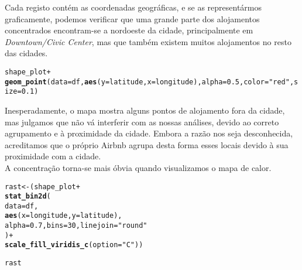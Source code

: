 \documentclass[a4paper, justified]{tufte-handout}\usepackage[]{graphicx}\usepackage[]{xcolor}
\makeatletter
\newcommand{\hlnum}[1]{\textcolor[rgb]{0.686,0.059,0.569}{#1}}%
\newcommand{\hlstr}[1]{\textcolor[rgb]{0.192,0.494,0.8}{#1}}%
\newcommand{\hlopt}[1]{\textcolor[rgb]{0,0,0}{#1}}%
\newcommand{\hlstd}[1]{\textcolor[rgb]{0.345,0.345,0.345}{#1}}%
\newcommand{\hlkwb}[1]{\textcolor[rgb]{0.69,0.353,0.396}{#1}}%
\newcommand{\hlkwc}[1]{\textcolor[rgb]{0.333,0.667,0.333}{#1}}%
\newcommand{\hlkwd}[1]{\textcolor[rgb]{0.737,0.353,0.396}{\textbf{#1}}}%
\newenvironment{kframe}{%
 \def\at@end@of@kframe{}%
 \ifinner\ifhmode%
  \def\at@end@of@kframe{\end{minipage}}%
  \begin{minipage}{\columnwidth}%
 \fi\fi%
 \def\FrameCommand##1{\hskip\@totalleftmargin \hskip-\fboxsep
 \colorbox{shadecolor}{##1}\hskip-\fboxsep
     \hskip-\linewidth \hskip-\@totalleftmargin \hskip\columnwidth}%
 \MakeFramed {\advance\hsize-\width
   \@totalleftmargin\z@ \linewidth\hsize
   \@setminipage}}%
 {\par\unskip\endMakeFramed%
 \at@end@of@kframe}
\newenvironment{knitrout}{}{} %
\makeatother
\begin{document}
Cada registo contém as coordenadas geográficas, e se as representármos graficamente, podemos verificar que uma grande parte dos alojamentos concentrados encontram-se a nordoeste da cidade, principalmente em \textit{Downtown/Civic Center}, mas que também existem muitos alojamentos no resto das cidades.  %
\begin{knitrout}
\color{fgcolor}\begin{kframe}
\begin{alltt}
\hlstd{shape_plot} \hlopt{+}
  \hlkwd{geom_point}\hlstd{(}\hlkwc{data}\hlstd{=df,} \hlkwd{aes}\hlstd{(}\hlkwc{y}\hlstd{=latitude,} \hlkwc{x}\hlstd{=longitude),} \hlkwc{alpha}\hlstd{=}\hlnum{0.5}\hlstd{,} \hlkwc{color}\hlstd{=}\hlstr{"red"}\hlstd{,} \hlkwc{size}\hlstd{=}\hlnum{0.1}\hlstd{)}
\end{alltt}


{\ttfamily\noindent\bfseries\color{errorcolor}{\#\# Error in eval(expr, envir, enclos): object 'shape\_plot' not found}}\end{kframe}
\end{knitrout}
Inesperadamente, o mapa mostra alguns pontos de alojamento fora da cidade, mas julgamos que não vá interferir com as nossas análises, devido ao correto agrupamento e à proximidade da cidade. Embora a razão nos seja desconhecida, acreditamos que o próprio Airbnb agrupa desta forma esses locais devido à sua proximidade com a cidade. \\
A concentração torna-se mais óbvia quando visualizamos o mapa de calor.
\begin{knitrout}
\color{fgcolor}\begin{kframe}
\begin{alltt}
\hlstd{rast} \hlkwb{<-} \hlstd{(shape_plot} \hlopt{+}
  \hlkwd{stat_bin2d}\hlstd{(}
    \hlkwc{data}\hlstd{=df,}
    \hlkwd{aes}\hlstd{(}\hlkwc{x}\hlstd{=longitude,} \hlkwc{y}\hlstd{=latitude),}
    \hlkwc{alpha}\hlstd{=}\hlnum{0.7}\hlstd{,} \hlkwc{bins} \hlstd{=} \hlnum{30}\hlstd{,} \hlkwc{linejoin}\hlstd{=}\hlstr{"round"}
  \hlstd{)} \hlopt{+}
  \hlkwd{scale_fill_viridis_c}\hlstd{(}\hlkwc{option}\hlstd{=}\hlstr{"C"}\hlstd{))}
\end{alltt}


{\ttfamily\noindent\bfseries\color{errorcolor}{\#\# Error in eval(expr, envir, enclos): object 'shape\_plot' not found}}\begin{alltt}
\hlstd{rast}
\end{alltt}


{\ttfamily\noindent\bfseries\color{errorcolor}{\#\# Error in eval(expr, envir, enclos): object 'rast' not found}}\end{kframe}
\end{knitrout}
\end{document}
